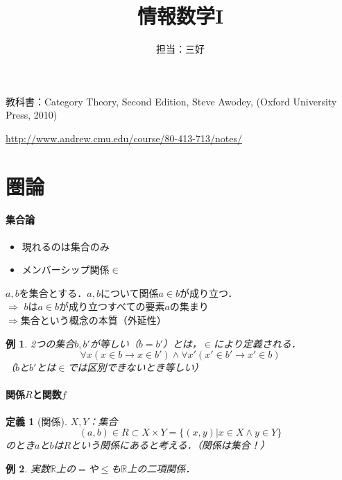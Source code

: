 \documentclass[dvipdfmx,a4j,10pt]{jsarticle}
\title{情報数学I}
\author{担当：三好}
\theoremstyle{mystyle1}
\theoremstyle{mystyle2}
\newtheorem{dfn*}{定義}
\newtheorem{example}{例}
\theoremstyle{mystyle3}
\begin{document}
\maketitle
教科書：Category Theory, Second Edition, Steve Awodey, (Oxford University Press, 2010)

\url{http://www.andrew.cmu.edu/course/80-413-713/notes/}

\tableofcontents%

\newpage

\section{圏論}


\paragraph{集合論}

\begin{itemize}
    \item 現れるのは集合のみ
    \item メンバーシップ関係$\in$
\end{itemize}

$a,b$を集合とする．$a,b$について関係$a\in b$が成り立つ．\\
$\Rightarrow$ $b$は$a\in b$が成り立つすべての要素$a$の集まり\\
$\Rightarrow$集合という概念の本質（外延性）

\begin{example}
    2つの集合$b,b'$が等しい（$b=b'$）とは，$\in$により定義される．
    \[
        \forall x(x\in b\to x\in b')\land \forall x'(x'\in b'\to x'\in b)
    \]
    （$b$と$b'$とは$\in$では区別できないとき等しい）
\end{example}

\paragraph{関係$R$と関数$f$}

\begin{dfn*}[関係]

    $X,Y$：集合
    \[
        (a,b)\in R\subset X\times Y=\{(x,y)|x\in X\land y\in Y\}
    \]
    のとき$a$と$b$は$R$という関係にあると考える．（関係は集合！）
\end{dfn*}

\begin{example}
    実数$\mathbb{R}$上の$=$や$\leq$も$\mathbb{R}$上の二項関係．
\end{example}
\end{document}
